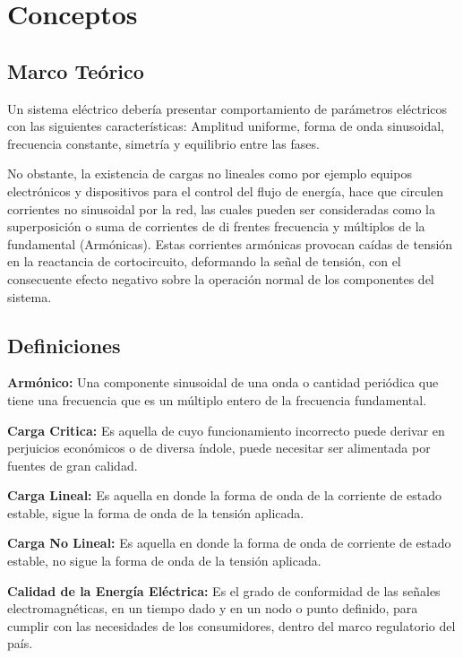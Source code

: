 \chapter{Conceptos} \label{sec:Conceptos}

\section{Marco Teórico}

Un sistema eléctrico debería presentar comportamiento de parámetros eléctricos con las siguientes características: Amplitud uniforme, forma de onda sinusoidal, frecuencia constante, simetría y equilibrio entre las fases.

No obstante, la existencia de cargas no lineales como por ejemplo equipos electrónicos y dispositivos para el control del flujo de energía, hace que circulen corrientes no sinusoidal por la red, las cuales pueden ser consideradas como la superposición o suma de corrientes de di frentes frecuencia y múltiplos de la fundamental (Armónicas). Estas corrientes armónicas provocan caídas de tensión en la reactancia de cortocircuito, deformando la señal de tensión, con el consecuente efecto negativo sobre la operación normal de los componentes del sistema.

\section{Definiciones}

\textbf{Armónico:} Una componente sinusoidal de una onda o cantidad periódica que tiene una frecuencia que es un múltiplo entero de la frecuencia fundamental.

\textbf{Carga Critica:} Es aquella de cuyo funcionamiento incorrecto puede derivar en perjuicios económicos o de diversa índole, puede necesitar ser alimentada por fuentes de gran calidad.

\textbf{Carga Lineal:} Es aquella en donde la forma de onda de la corriente de estado estable, sigue la forma de onda de la tensión aplicada.

\textbf{Carga No Lineal:} Es aquella en donde la forma de onda de corriente de estado estable, no sigue la forma de onda de la tensión aplicada.

\textbf{Calidad de la Energía Eléctrica:} Es el grado de conformidad de las señales electromagnéticas, en un tiempo dado y en un nodo o punto definido, para cumplir con las necesidades de los consumidores, dentro del marco regulatorio del país.

